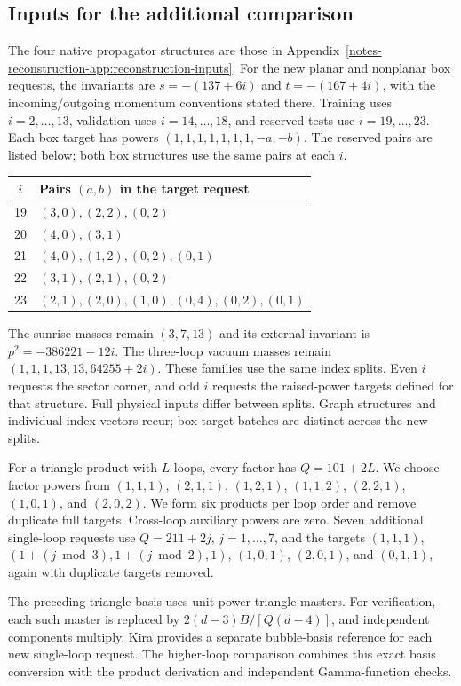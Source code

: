 \subsection{Inputs for the additional comparison}
The four native propagator structures are those in Appendix~\ref{notes-reconstruction-app:reconstruction-inputs}. For the new planar and nonplanar box requests, the invariants are $s=-(137+6i)$ and $t=-(167+4i)$, with the incoming/outgoing momentum conventions stated there. Training uses $i=2,\ldots,13$, validation uses $i=14,\ldots,18$, and reserved tests use $i=19,\ldots,23$. Each box target has powers $(1,1,1,1,1,1,1,-a,-b)$. The reserved pairs are listed below; both box structures use the same pairs at each $i$.
\begin{center}\small\begin{tabular}{cl}\toprule
$i$ & Pairs $(a,b)$ in the target request\\\midrule
19 & $(3,0), (2,2), (0,2)$ \\
20 & $(4,0), (3,1)$ \\
21 & $(4,0), (1,2), (0,2), (0,1)$ \\
22 & $(3,1), (2,1), (0,2)$ \\
23 & $(2,1), (2,0), (1,0), (0,4), (0,2), (0,1)$ \\
\bottomrule\end{tabular}\end{center}
The sunrise masses remain $(3,7,13)$ and its external invariant is $p^2=-386221-12i$. The three-loop vacuum masses remain $(1,1,1,13,13,64255+2i)$. These families use the same index splits. Even $i$ requests the sector corner, and odd $i$ requests the raised-power targets defined for that structure. Full physical inputs differ between splits. Graph structures and individual index vectors recur; box target batches are distinct across the new splits.

For a triangle product with $L$ loops, every factor has $Q=101+2L$. We choose factor powers from $(1,1,1)$, $(2,1,1)$, $(1,2,1)$, $(1,1,2)$, $(2,2,1)$, $(1,0,1)$, and $(2,0,2)$. We form six products per loop order and remove duplicate full targets. Cross-loop auxiliary powers are zero. Seven additional single-loop requests use $Q=211+2j$, $j=1,\ldots,7$, and the targets $(1,1,1)$, $(1+(j\bmod3),1+(j\bmod2),1)$, $(1,0,1)$, $(2,0,1)$, and $(0,1,1)$, again with duplicate targets removed.

The preceding triangle basis uses unit-power triangle masters. For verification, each such master is replaced by $2(d-3)B/[Q(d-4)]$, and independent components multiply. Kira provides a separate bubble-basis reference for each new single-loop request. The higher-loop comparison combines this exact basis conversion with the product derivation and independent Gamma-function checks.
